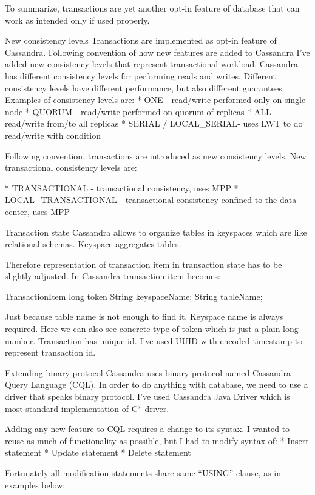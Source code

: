 To summarize, transactions are yet another opt-in feature of database that can work as intended only if used properly. 


New consistency levels
Transactions are implemented as opt-in feature of Cassandra. Following convention of how new features are added to Cassandra I’ve added new consistency levels that represent transactional workload.
Cassandra has different consistency levels for performing reads and writes. Different consistency levels have different performance, but also different guarantees. Examples of consistency levels are:
* ONE - read/write performed only on single node
* QUORUM - read/write performed on quorum of replicas
* ALL - read/write from/to all replicas
* SERIAL / LOCAL_SERIAL- uses LWT to do read/write with condition


Following convention, transactions are introduced as new consistency levels. New transactional consistency levels are:


* TRANSACTIONAL - transactional consistency, uses MPP
* LOCAL_TRANSACTIONAL - transactional consistency confined to the data center, uses MPP


Transaction state
Cassandra allows to organize tables in keyspaces which are like relational schemas. Keyspace aggregates tables. 


Therefore representation of transaction item in transaction state has to be slightly adjusted. In Cassandra transaction item becomes:


TransactionItem {
   long token
   String keyspaceName;
   String tableName;
}


Just because table name is not enough to find it. Keyspace name is always required. Here we can also see concrete type of token which is just a plain long number.
Transaction has unique id. I’ve used UUID with encoded timestamp to represent transaction id.


Extending binary protocol
Cassandra uses binary protocol named Cassandra Query Language (CQL). In order to do anything with database, we need to use a driver that speaks binary protocol. I’ve used Cassandra Java Driver which is most standard implementation of C* driver.


Adding any new feature to CQL requires a change to its syntax. I wanted to reuse as much of functionality as possible, but I had to modify syntax of:
* Insert statement
* Update statement
* Delete statement


Fortunately all modification statements share same “USING” clause, as in examples below:


